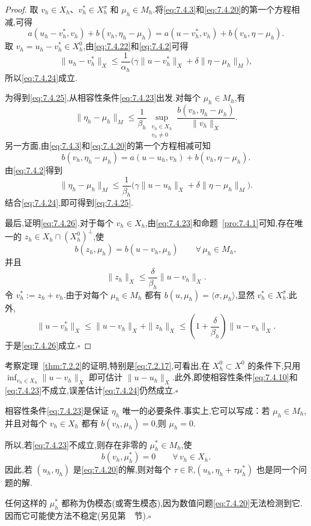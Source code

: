 \begin{proof}
取 \(v_h\in X_h\)、\(v_h^*\in X_h^\sigma\) 和 \(\mu_h\in M_h\).将\eqref{eq:7.4.3}和\eqref{eq:7.4.20}的第一个方程相减,可得
\[
  a(u_h-v_h^*,v_h)+b(v_h,\eta_h-\mu_h)
     =a(u-v_h^*,v_h)+b(v_h,\eta-\mu_h).
\]
取 \(v_h=u_h-v_h^*\in X_h^0\),由\eqref{eq:7.4.22}和\eqref{eq:7.4.2}可得
\[
  \|u_h-v_h^*\|_X
     \le\frac1{\alpha_h}\bigl(\gamma\|u-v_h^*\|_X+\delta\|\eta-\mu_h\|_M\bigr),
\]
所以\eqref{eq:7.4.24}成立.

为得到\eqref{eq:7.4.25},从相容性条件\eqref{eq:7.4.23}出发.对每个 \(\mu_h\in M_h\),有
\[
  \|\eta_h-\mu_h\|_M
    \le\frac1{\beta_h}\sup_{\substack{v_h\in X_h\\v_h\ne0}}
       \frac{b(v_h,\eta_h-\mu_h)}{\|v_h\|_X}.
\]
另一方面,由\eqref{eq:7.4.3}和\eqref{eq:7.4.20}的第一个方程相减可知
\[
  b(v_h,\eta_h-\mu_h)=a(u-u_h,v_h)+b(v_h,\eta-\mu_h).
\]
由\eqref{eq:7.4.2}得到
\[
  \|\eta_h-\mu_h\|_M
    \le\frac1{\beta_h}\bigl(\gamma\|u-u_h\|_X+\delta\|\eta-\mu_h\|_M\bigr).
\]
结合\eqref{eq:7.4.24},即可得到\eqref{eq:7.4.25}.

最后,证明\eqref{eq:7.4.26}.对于每个 \(v_h\in X_h\),由\eqref{eq:7.4.23}和命题~\ref{pro:7.4.1}可知,存在唯一的 \(z_h\in X_h\cap(X_h^0)^\perp\),使
\[
  b(z_h,\mu_h)=b(u-v_h,\mu_h)\qquad\forall\,\mu_h\in M_h,
\]
并且
\[
  \|z_h\|_X\le\frac{\delta}{\beta_h}\|u-v_h\|_X.
\]
令 \(v_h^*:=z_h+v_h\).由于对每个 \(\mu_h\in M_h\) 都有 \(b(u,\mu_h)=\langle\sigma,\mu_h\rangle\),显然 \(v_h^*\in X_h^\sigma\).此外,
\[
  \|u-v_h^*\|_X\le\|u-v_h\|_X+\|z_h\|_X
    \le\left(1+\frac{\delta}{\beta_h}\right)\|u-v_h\|_X.
\]
于是\eqref{eq:7.4.26}成立.\hfill\(\square\)
\end{proof}

\begin{note}
考察定理~\ref{thm:7.2.2}的证明,特别是\eqref{eq:7.2.17},可看出,在 \(X_h^0\subset X^0\) 的条件下,只用 \(\inf_{v_h\in X_h}\|u-v_h\|_X\) 即可估计 \(\|u-u_h\|_X\).此外,即使相容性条件\eqref{eq:7.4.10}和\eqref{eq:7.4.23}不成立,误差估计\eqref{eq:7.4.24}仍然成立.\hfill\(\square\)
\end{note}

\begin{note}
相容性条件\eqref{eq:7.4.23}是保证 \(\eta_h\) 唯一的必要条件.事实上,它可以写成：若 \(\mu_h\in M_h\),并且对每个 \(v_h\in X_h\) 都有 \(b(v_h,\mu_h)=0\),则 \(\mu_h=0\).

所以,若\eqref{eq:7.4.23}不成立,则存在非零的 \(\mu_h^*\in M_h\),使
\[
  b(v_h,\mu_h^*)=0\qquad\forall\,v_h\in X_h.
\]
因此,若 \((u_h,\eta_h)\) 是\eqref{eq:7.4.20}的解,则对每个 \(\tau\in\mathbb R\),\((u_h,\eta_h+\tau\mu_h^*)\) 也是同一个问题的解.

任何这样的 \(\mu_h^*\) 都称为{\heiti 伪模态}(或{\heiti 寄生模态}),因为数值问题\eqref{eq:7.4.20}无法检测到它.因而它可能使方法不稳定(另见第~~节).\hfill\(\square\)
\end{note}

